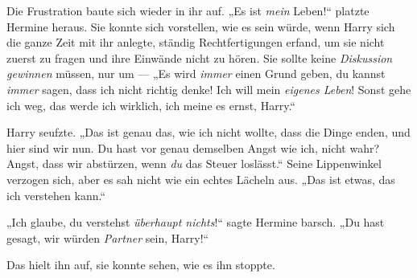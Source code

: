 Die Frustration baute sich wieder in ihr auf.
„Es ist \emph{mein} Leben!“ platzte Hermine heraus. Sie konnte sich vorstellen, wie es sein würde, wenn Harry sich die ganze Zeit mit ihr anlegte, ständig Rechtfertigungen erfand, um sie nicht zuerst zu fragen und ihre Einwände nicht zu hören. Sie sollte keine \emph{Diskussion gewinnen} müssen, nur um —
„Es wird \emph{immer} einen Grund geben, du kannst \emph{immer} sagen, dass ich nicht richtig denke! Ich will mein \emph{eigenes Leben}! Sonst gehe ich weg, das werde ich wirklich, ich meine es ernst, Harry.“

Harry seufzte.
„Das ist genau das, wie ich nicht wollte, dass die Dinge enden, und hier sind wir nun. Du hast vor genau demselben Angst wie ich, nicht wahr? Angst, dass wir abstürzen, wenn \emph{du} das Steuer loslässt.“ Seine Lippenwinkel verzogen sich, aber es sah nicht wie ein echtes Lächeln aus.
„Das ist etwas, das ich verstehen kann.“

„Ich glaube, du verstehst \emph{überhaupt nichts}!“ sagte Hermine barsch.
„Du hast gesagt, wir würden \emph{Partner} sein, Harry!“

Das hielt ihn auf, sie konnte sehen, wie es ihn stoppte.

